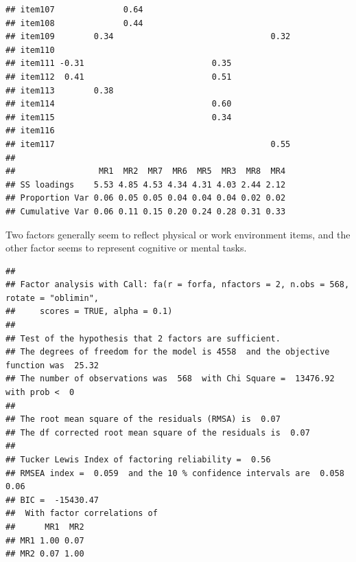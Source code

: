 \documentclass[
  english,
  man]{apa6}
\begin{document}
\begin{verbatim}
## item107              0.64                              
## item108              0.44                              
## item109        0.34                                0.32
## item110                                                
## item111 -0.31                          0.35            
## item112  0.41                          0.51            
## item113        0.38                                    
## item114                                0.60            
## item115                                0.34            
## item116                                                
## item117                                            0.55
## 
##                 MR1  MR2  MR7  MR6  MR5  MR3  MR8  MR4
## SS loadings    5.53 4.85 4.53 4.34 4.31 4.03 2.44 2.12
## Proportion Var 0.06 0.05 0.05 0.04 0.04 0.04 0.02 0.02
## Cumulative Var 0.06 0.11 0.15 0.20 0.24 0.28 0.31 0.33
\end{verbatim}

Two factors generally seem to reflect physical or work environment items, and the other factor seems to represent cognitive or mental tasks.

\begin{verbatim}
## 
## Factor analysis with Call: fa(r = forfa, nfactors = 2, n.obs = 568, rotate = "oblimin", 
##     scores = TRUE, alpha = 0.1)
## 
## Test of the hypothesis that 2 factors are sufficient.
## The degrees of freedom for the model is 4558  and the objective function was  25.32 
## The number of observations was  568  with Chi Square =  13476.92  with prob <  0 
## 
## The root mean square of the residuals (RMSA) is  0.07 
## The df corrected root mean square of the residuals is  0.07 
## 
## Tucker Lewis Index of factoring reliability =  0.56
## RMSEA index =  0.059  and the 10 % confidence intervals are  0.058 0.06
## BIC =  -15430.47
##  With factor correlations of 
##      MR1  MR2
## MR1 1.00 0.07
## MR2 0.07 1.00
\end{verbatim}
\end{document}
